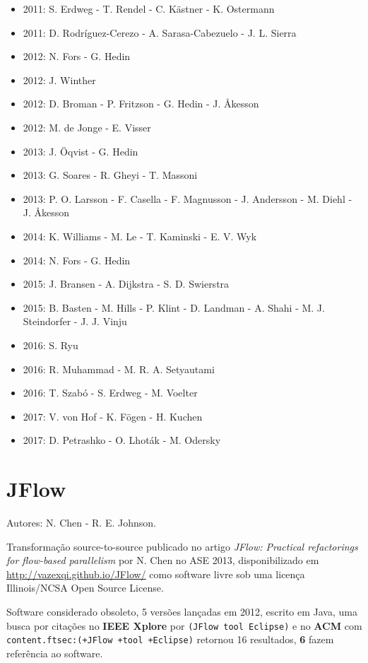 \begin{itemize}
\item 2011: S. Erdweg - T. Rendel - C. K\"{a}stner - K. Ostermann
\item 2011: D. Rodríguez-Cerezo - A. Sarasa-Cabezuelo - J. L. Sierra
\item 2012: N. Fors - G. Hedin
\item 2012: J. Winther
\item 2012: D. Broman - P. Fritzson - G. Hedin - J. Åkesson
\item 2012: M. de Jonge - E. Visser
\item 2013: J. \"{O}qvist - G. Hedin
\item 2013: G. Soares - R. Gheyi - T. Massoni
\item 2013: P. O. Larsson - F. Casella - F. Magnusson - J. Andersson - M. Diehl - J. Åkesson
\item 2014: K. Williams - M. Le - T. Kaminski - E. V. Wyk
\item 2014: N. Fors - G. Hedin
\item 2015: J. Bransen - A. Dijkstra - S. D. Swierstra
\item 2015: B. Basten - M. Hills - P. Klint - D. Landman - A. Shahi - M. J. Steindorfer - J. J. Vinju
\item 2016: S. Ryu
\item 2016: R. Muhammad - M. R. A. Setyautami
\item 2016: T. Szabó - S. Erdweg - M. Voelter
\item 2017: V. von Hof - K. F\"{o}gen - H. Kuchen
\item 2017: D. Petrashko - O. Lhot\'{a}k - M. Odersky
\end{itemize}

\section{JFlow}

Autores:
N. Chen - R. E. Johnson.

Transformação source-to-source
publicado no artigo {\it JFlow: Practical refactorings for flow-based parallelism}
por N. Chen
no ASE 2013,
disponibilizado em \url{http://vazexqi.github.io/JFlow/}
como software livre
sob uma licença Illinois/NCSA Open Source License.

Software considerado obsoleto,
5 versões lançadas
em 2012,
escrito em Java,
uma busca por citações no {\bf IEEE Xplore} por
\texttt{(JFlow tool Eclipse)}
e no {\bf ACM} com
\texttt{content.ftsec:(+JFlow +tool +Eclipse)}
retornou
16 resultados,
{\bf 6} fazem referência ao software.

